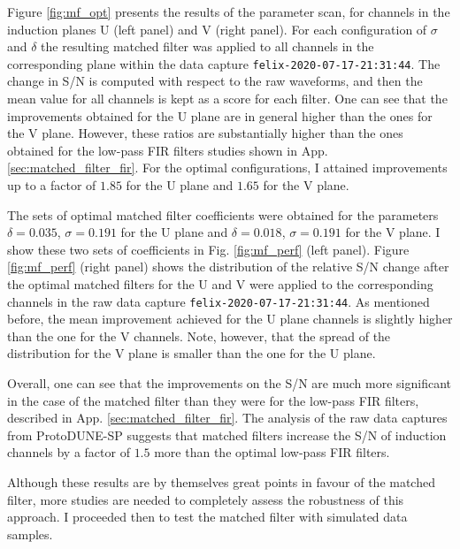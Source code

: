 Figure \ref{fig:mf_opt} presents the results of the parameter scan, for channels in the induction planes U (left panel) and V (right panel). For each configuration of $\sigma$ and $\delta$ the resulting matched filter was applied to all channels in the corresponding plane within the data capture \texttt{felix-2020-07-17-21:31:44}. The change in S/N is computed with respect to the raw waveforms, and then the mean value for all channels is kept as a score for each filter. One can see that the improvements obtained for the U plane are in general higher than the ones for the V plane. However, these ratios are substantially higher than the ones obtained for the low-pass FIR filters studies shown in App. \ref{sec:matched_filter_fir}. For the optimal configurations, I attained improvements up to a factor of $1.85$ for the U plane and $1.65$ for the V plane.

The sets of optimal matched filter coefficients were obtained for the parameters $\delta = 0.035$, $\sigma = 0.191$ for the U plane and $\delta = 0.018$, $\sigma = 0.191$ for the V plane. I show these two sets of coefficients in Fig. \ref{fig:mf_perf} (left panel). Figure \ref{fig:mf_perf} (right panel) shows the distribution of the relative S/N change after the optimal matched filters for the U and V were applied to the corresponding channels in the raw data capture \texttt{felix-2020-07-17-21:31:44}. As mentioned before, the mean improvement achieved for the U plane channels is slightly higher than the one for the V channels. Note, however, that the spread of the distribution for the V plane is smaller than the one for the U plane.

Overall, one can see that the improvements on the S/N are much more significant in the case of the matched filter than they were for the low-pass FIR filters, described in App. \ref{sec:matched_filter_fir}. The analysis of the raw data captures from ProtoDUNE-SP suggests that matched filters increase the S/N of induction channels by a factor of $1.5$ more than the optimal low-pass FIR filters.

Although these results are by themselves great points in favour of the matched filter, more studies are needed to completely assess the robustness of this approach. I proceeded then to test the matched filter with simulated data samples.

